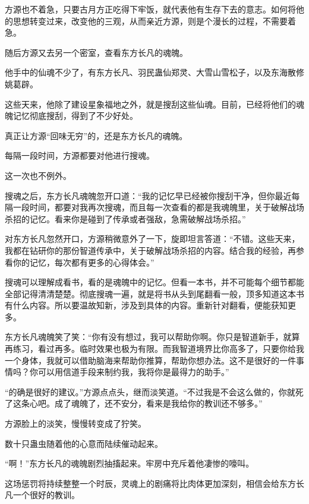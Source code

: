 
\begin{this_body}

方源也不着急，只要古月方正吃得下牢饭，就代表他有生存下去的意志。如何将他的思想转变过来，改变他的三观，从而亲近方源，则是个漫长的过程，不需要着急。

随后方源又去另一个密室，查看东方长凡的魂魄。

他手中的仙魂不少了，有东方长凡、羽民蛊仙郑灵、大雪山雪松子，以及东海散修姚葛辟。

这些天来，他除了建设星象福地之外，就是搜刮这些仙魂。目前，已经将他们的魂魄记忆彻底搜刮，得到了不少好处。

真正让方源“回味无穷”的，还是东方长凡的魂魄。

每隔一段时间，方源都要对他进行搜魂。

这一次也不例外。

搜魂之后，东方长凡魂魄忽开口道：“我的记忆早已经被你搜刮干净，但你最近每隔一段时间，都要对我再次搜魂，而且每一次查看的都是我魂魄里，关于破解战场杀招的记忆。看来你是碰到了传承或者强敌，急需破解战场杀招。”

对东方长凡忽然开口，方源稍微意外了一下，旋即坦言答道：“不错。这些天来，我都在钻研你的那份智道传承中，关于破解战场杀招的内容。结合我的经验，再参看你的记忆，每次都有更多的心得体会。”

搜魂可以理解成看书，看的是魂魄中的记忆。但看一本书，并不可能每个细节都能全部记得清清楚楚。彻底搜魂一遍，就是将书从头到尾翻看一般，顶多知道这本书有什么内容。所以要温故知新，涉及到具体的内容。重新针对翻看，便能获知更多。

东方长凡魂魄笑了笑：“你有没有想过，我可以帮助你啊。你只是智道新手，就算再练习，看过再多。临时效果也极为有限。而我智道境界比你高多了，只要你给我一个身体，我就可以借助脑海来帮助你推算，帮助你想办法。这不是很好的一件事情吗？你可以用信道手段来制约我，我将你是最得力的助手。”

“的确是很好的建议。”方源点点头，继而淡笑道。“不过我是不会这么做的，你就死了这条心吧。成了魂魄了，还不安分，看来是我给你的教训还不够多。”

方源脸上的淡笑，慢慢转变成了狞笑。

数十只蛊虫随着他的心意而陆续催动起来。

“啊！”东方长凡的魂魄剧烈抽搐起来。牢房中充斥着他凄惨的嚎叫。

这场惩罚将持续整整一个时辰，灵魂上的剧痛将比肉体更加深刻，相信会给东方长凡一个很好的教训。


\end{this_body}
